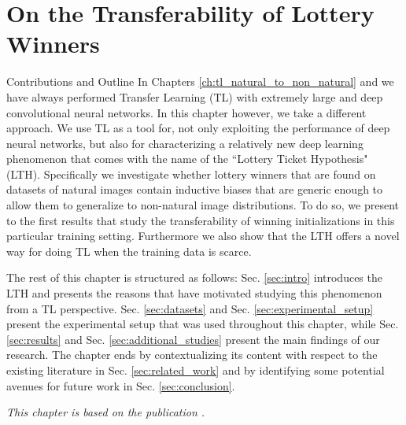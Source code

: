 
\chapter{On the Transferability of Lottery Winners} %
\label{ch:tl_lth} %

\begin{remark}{Contributions and Outline}
In Chapters \ref{ch:tl_natural_to_non_natural} and we have always performed Transfer Learning (TL) with extremely large and deep convolutional neural networks. In this chapter however, we take a different approach. We use TL as a tool for, not only exploiting the performance of deep neural networks, but also for characterizing a relatively new deep learning phenomenon that comes with the name of the ``Lottery Ticket Hypothesis" (LTH). Specifically we investigate whether lottery winners that are found on datasets of natural images contain inductive biases that are generic enough to allow them to generalize to non-natural image distributions. To do so, we present to the first results that study the transferability of winning initializations in this particular training setting. Furthermore we also show that the LTH offers a novel way for doing TL when the training data is scarce. 

The rest of this chapter is structured as follows: Sec. \ref{sec:intro} introduces the LTH and presents the reasons that have motivated studying this phenomenon from a TL perspective. Sec. \ref{sec:datasets} and Sec. \ref{sec:experimental_setup} present the experimental setup that was used throughout this chapter, while Sec. \ref{sec:results} and Sec. \ref{sec:additional_studies} present the main findings of our research. The chapter ends by contextualizing its content with respect to the existing literature in Sec. \ref{sec:related_work} and by identifying some potential avenues for future work in Sec. \ref{sec:conclusion}.

\vspace{5mm}
\textit{This chapter is based on the publication \citet{sabatelli2020transferability}.}

\end{remark}

